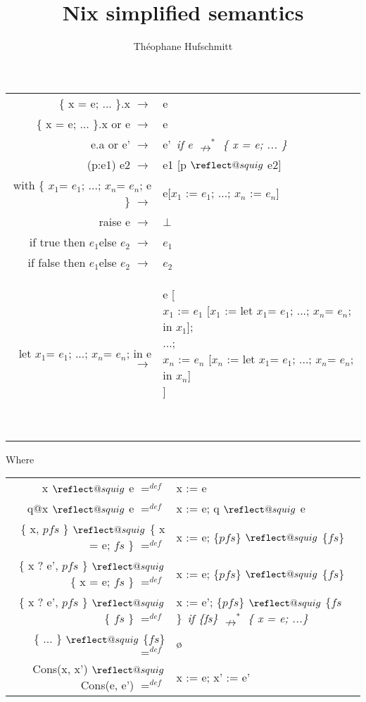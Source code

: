 \documentclass{article}
\title{Nix simplified semantics}
\author{Théophane Hufschmitt}
\date{}
\makeatletter
\providecommand{\leftsquigarrow}{%
  \mathrel{\mathpalette\reflect@squig\relax}%
}
\newcommand{\reflect@squig}[2]{%
  \reflectbox{$\m@th#1\rightsquigarrow$}%
}
\newcommand{\assign}[2]{#1 := #2}
\newcommand{\assignp} [2] {#1 \ensuremath{\leftsquigarrow} #2}
\newcommand{\subst} [3] {#3 [\assign{#1}{#2}]}
\newcommand{\substp} [3] {#3 [\assignp{#1}{#2}]}
\newcommand{\dstep} [2] {#1 \ensuremath{\rightarrow} #2}
\newcommand{\ndsteps} [2] {#1 \ensuremath{\nrightarrow^*} #2}
\newcommand{\dstepa} [3] {\dstep{#1}{&#2}~\emph{#3} \\}
\newcommand{\eqdef}[2]{#1 \ensuremath{=^{def}} #2}
\newcommand{\eqdefa}[3]{\eqdef{#1}{&#2} \emph{#3} \\}
\newcommand{\xone}{\ensuremath{x_1}}
\newcommand{\xn}{\ensuremath{x_n}}
\newcommand{\eone}{\ensuremath{e_1}}
\newcommand{\etwo}{\ensuremath{e_2}}
\newcommand{\en}{\ensuremath{e_n}}
\makeatother
\begin{document}
\maketitle{}

\begin{tabular}{rl}
  \dstepa{\{ x = e; ... \}.x}{e}{}
  \dstepa{\{ x = e; ... \}.x or e}{e}{}
  \dstepa{e.a or e'}{e'}{if \ndsteps{e}{\{ x = e; ... \}}}
  \dstepa{(p:e1) e2}{\substp{p}{e2}{e1}}{}
  \dstepa{with \{ \xone = \eone; ...; \xn= \en; e \}}{%
    e[\assign{\xone}{\eone}; ...; \assign{\xn}{\en}]
  }{}
  \dstepa{raise e}{$\bot$}{}
  \dstepa{if true then \eone else \etwo}{\eone}{}
  \dstepa{if false then \eone else \etwo}{\etwo}{}
  \dstepa{let \xone = \eone; ...; \xn = \en; in e}{%
    \parbox[t]{10cm}{e [ \\
      \assign{\xone}{\subst{\xone}{let \xone = \eone; ...; \xn = \en; in \xone}{\eone}}; \\
      ...; \\
      \assign{\xn}{\subst{\xn}{let \xone = \eone; ...; \xn = \en; in \xn}{\en}} \\
    ]}
  }{}
\end{tabular}

Where

\begin{tabular}{rl}
  \eqdefa{\assignp{x}{e}}{\assign{x}{e}}{}
  \eqdefa{\assignp{q@x}{e}}{\assign{x}{e}; \assignp{q}{e}}{}
  \eqdefa{\assignp{\{ x, $pfs$ \}}{\{ x = e; $fs$ \}}}{%
    \assign{x}{e}; \assignp{\{$pfs$\}}{\{$fs$\}}}{}
  \eqdefa{\assignp{\{ x ? e', $pfs$ \}}{\{ x = e; $fs$ \}}}{%
    \assign{x}{e}; \assignp{\{$pfs$\}}{\{$fs$\}}}{}
  \eqdefa{\assignp{\{ x ? e', $pfs$ \}}{\{ $fs$ \}}}{%
    \assign{x}{e'}; \assignp{\{$pfs$\}}{\{$fs$\}}}{if \ndsteps{\{fs\}}{\{ x = e; ...\}}}
  \eqdefa{\assignp{\{ ... \}}{\{$fs$\}}}{ø}{}
  \eqdefa{\assignp{Cons(x, x')}{Cons(e, e')}}{\assign{x}{e}; \assign{x'}{e'}}{}
\end{tabular}
\end{document}
